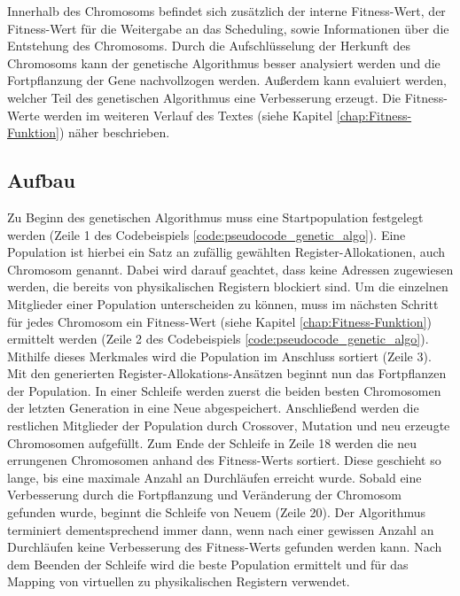 Innerhalb des Chromosoms befindet sich zusätzlich der interne Fitness-Wert, der Fitness-Wert für die Weitergabe an das Scheduling, sowie Informationen über die Entstehung des Chromosoms. Durch die Aufschlüsselung der Herkunft des Chromosoms kann der genetische Algorithmus besser analysiert werden und die Fortpflanzung der Gene nachvollzogen werden. Außerdem kann evaluiert werden, welcher Teil des genetischen Algorithmus eine Verbesserung erzeugt. Die Fitness-Werte werden im weiteren Verlauf des Textes (siehe Kapitel \ref{chap:Fitness-Funktion}) näher beschrieben.
 
 
\subsection{Aufbau}
\label{chap:aufbau}
Zu Beginn des genetischen Algorithmus muss eine Startpopulation festgelegt werden (Zeile 1 des Codebeispiels \ref{code:pseudocode_genetic_algo}). Eine Population ist hierbei ein Satz an zufällig gewählten Register-Allokationen, auch Chromosom genannt. Dabei wird darauf geachtet, dass keine Adressen zugewiesen werden, die bereits von physikalischen Registern blockiert sind.
Um die einzelnen Mitglieder einer Population unterscheiden zu können, muss im nächsten Schritt für jedes Chromosom ein Fitness-Wert (siehe Kapitel \ref{chap:Fitness-Funktion}) ermittelt werden (Zeile 2 des Codebeispiels \ref{code:pseudocode_genetic_algo}). Mithilfe dieses Merkmales wird die Population im Anschluss sortiert (Zeile 3). 
Mit den generierten Register-Allokations-Ansätzen beginnt nun das Fortpflanzen der Population. In einer Schleife werden zuerst die beiden besten Chromosomen der letzten Generation in eine Neue abgespeichert. Anschließend werden die restlichen Mitglieder der Population durch Crossover, Mutation und neu erzeugte Chromosomen aufgefüllt. Zum Ende der Schleife in Zeile 18 werden die neu errungenen Chromosomen anhand des Fitness-Werts sortiert. Diese geschieht so lange, bis eine maximale Anzahl an Durchläufen erreicht wurde. Sobald eine Verbesserung durch die Fortpflanzung und Veränderung der Chromosom gefunden wurde, beginnt die Schleife von Neuem (Zeile 20). Der Algorithmus terminiert dementsprechend immer dann, wenn nach einer gewissen Anzahl an Durchläufen keine Verbesserung des Fitness-Werts gefunden werden kann. Nach dem Beenden der Schleife wird die beste Population ermittelt und für das Mapping von virtuellen zu physikalischen Registern verwendet.

